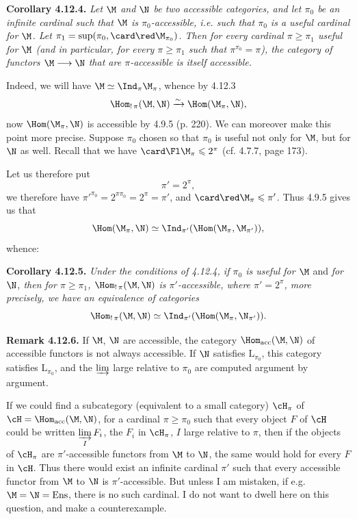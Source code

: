 \textbf{Corollary 4.12.4.} \textit{Let $\M$ and $\N$ be two accessible categories, and let $\pi_0$ be an infinite cardinal such that $\M$ is $\pi_0$-accessible, i.e. such that $\pi_0$ is a useful cardinal for $\M$. Let $\pi_1 = \sup(\pi_0,\allowbreak \card\red\M_{\pi_0})$. Then for every cardinal $\pi \geqslant \pi_1$ useful for $\M$ (and in particular, for every $\pi \geqslant \pi_1$ such that $\pi^{\pi_0} = \pi$), the category of functors $\M \longrightarrow \N$ that are $\pi$-accessible is itself accessible.}

Indeed, we will have $\M \simeq \Ind_\pi\M_\pi$, whence by 4.12.3
\[
\Hom_{!\,\pi}(\M,\N) \xrightarrow{\sim} \Hom(\M_\pi,\N) ,
\]
now $\Hom(\M_\pi,\N)$ is accessible by 4.9.5 (p. 220). We can moreover make this point more precise. Suppose $\pi_0$ chosen so that $\pi_0$ is useful not only for $\M$, but for $\N$ as well. Recall that we have $\card\Fl\M_\pi \leqslant 2^\pi$ (cf. 4.7.7, page 173).

Let us therefore put
\[
\pi' = 2^\pi ,
\]
we therefore have $\pi'^{\pi_0} = 2^{\pi\pi_0} = 2^\pi = \pi'$, and $\card\red\M_\pi \leqslant \pi'$. Thus 4.9.5 gives us that
\[
\Hom(\M_\pi,\N) \simeq \Ind_{\pi'}(\Hom(\M_\pi,\M_{\pi'})) , %
\]
whence:

\textbf{Corollary 4.12.5.} \textit{Under the conditions of 4.12.4, if $\pi_0$ is useful for $\M$} and \textit{for $\N$, then for $\pi \geqslant \pi_1$, $\Hom_{!\,\pi}(\M,\N)$ is $\pi'$-accessible, where $\pi' = 2^\pi$, more precisely, we have an equivalence of categories}
\[
\Hom_{!\,\pi}(\M,\N) \simeq \Ind_{\pi'}(\Hom(\M_\pi,\N_{\pi'})) .
\]

\textbf{Remark 4.12.6.} If $\M$, $\N$ are accessible, the category $\Hom_{\mathrm{acc}}(\M,\N)$ of accessible functors is not always accessible. If $\N$ satisfies $\mathrm{L}_{\pi_0}$, this category satisfies $\mathrm{L}_{\pi_0}$, %
and the $\varinjlim$ large relative to $\pi_0$ are computed argument by argument.

If we could find a subcategory (equivalent to a small category) $\cH_\pi$ of $\cH = \Hom_{\mathrm{acc}}(\M,\N)$, for a cardinal $\pi \geqslant \pi_0$ such that every object $F$ of $\cH$ could be written $\varinjlim\limits_{I} F_i$, the $F_i$ in $\cH_\pi$, $I$ large relative to $\pi$, then if the objects of $\cH_\pi$ are $\pi'$-accessible functors from $\M$ to $\N$, the same would hold for every $F$ in $\cH$. Thus there would exist an infinite cardinal $\pi'$ such that every accessible functor from $\M$ to $\N$ is $\pi'$-accessible. But unless I am mistaken, if e.g. $\M = \N = \mathrm{Ens}$, there is no such cardinal. I do not want to dwell here on this question, and make a counterexample.

